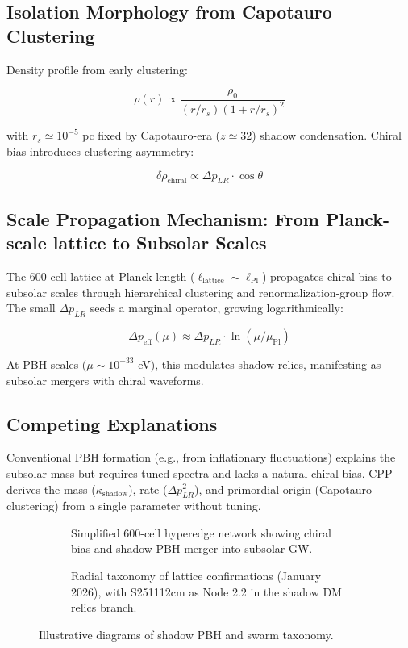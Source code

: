 \documentclass[11pt]{article}
\begin{document}
\subsection{Isolation Morphology from Capotauro Clustering}
Density profile from early clustering:

\[
\rho(r) \propto \frac{\rho_0}{(r/r_s)(1 + r/r_s)^2}
\]

with $r_s \simeq 10^{-5}$ pc fixed by Capotauro-era ($z \simeq 32$) shadow condensation. Chiral bias introduces clustering asymmetry:

\[
\delta \rho_{\text{chiral}} \propto \Delta p_{LR} \cdot \cos\theta
\]

\subsection{Scale Propagation Mechanism: From Planck-scale lattice to Subsolar Scales}
The 600-cell lattice at Planck length ($\ell_{\text{lattice}} \sim \ell_{\text{Pl}}$) propagates chiral bias to subsolar scales through hierarchical clustering and renormalization-group flow. The small $\Delta p_{LR}$ seeds a marginal operator, growing logarithmically:

\[
\Delta p_{\text{eff}}(\mu) \approx \Delta p_{LR} \cdot \ln(\mu / \mu_{\text{Pl}})
\]

At PBH scales ($\mu \sim 10^{-33}$ eV), this modulates shadow relics, manifesting as subsolar mergers with chiral waveforms.

\subsection{Competing Explanations}
Conventional PBH formation (e.g., from inflationary fluctuations) explains the subsolar mass but requires tuned spectra and lacks a natural chiral bias. CPP derives the mass ($\kappa_{\text{shadow}}$), rate ($\Delta p_{LR}^2$), and primordial origin (Capotauro clustering) from a single parameter without tuning.

\begin{figure}[htbp]
\centering
\begin{subfigure}{0.45\textwidth}
\centering
\caption{Simplified 600-cell hyperedge network showing chiral bias and shadow PBH merger into subsolar GW.}
\label{fig:shadow-pbh}
\end{subfigure}
\hfill
\begin{subfigure}{0.45\textwidth}
\centering
\caption{Radial taxonomy of lattice confirmations (January 2026), with S251112cm as Node 2.2 in the shadow DM relics branch.}
\label{fig:taxonomy}
\end{subfigure}
\caption{Illustrative diagrams of shadow PBH and swarm taxonomy.}
\end{figure}
\end{document}
